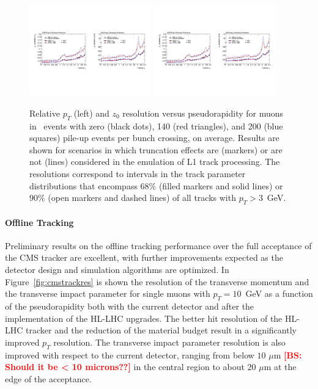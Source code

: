 \begin{figure}[h!tbp]
\begin{center}
  \includegraphics[width=0.47\textwidth]{figures/cmsupgrade/TDR-17-001_fig6_8_a.pdf} \hfill
  \includegraphics[width=0.47\textwidth]{figures/cmsupgrade/TDR-17-001_fig6_8_b.pdf}
  \caption{ Relative $p_T$ (left) and $z_0$ resolution versus pseudorapidity for muons in \ttbar~events with zero (black dots), 140 (red triangles), and 200 (blue squares) pile-up events per bunch crossing, on average. Results are shown for scenarios in which truncation effects are (markers) or are not (lines) considered in the emulation of L1 track processing. The resolutions correspond to intervals in the track parameter distributions that encompass $68\%$ (filled markers and solid lines) or $90\%$ (open markers and dashed lines) of all tracks with $p_T > 3$~GeV.}
  \label{fig:cmsL1tracks}
\end{center}
\end{figure}

\paragraph{Offline Tracking}

Preliminary results on the offline tracking performance over the full acceptance of the CMS tracker are excellent, with further improvements expected as the detector design and simulation algorithms are optimized. In Figure~\ref{fig:cmstrackres} is shown the resolution of the transverse momentum and the transverse impact parameter for single muons with $p_T = 10$~GeV as a function of the pseudorapidity both with the current detector and after the implementation of the HL-LHC upgrades. The better hit resolution of the HL-LHC tracker and the reduction of the material budget result in a significantly improved $p_T$ resolution. The transverse impact parameter resolution is also improved with respect to the current detector, ranging from below $10\,\,\mu\mathrm{m}$ {\bf \textcolor{red}{[BS: Should it be < 10 microns??]}} in the central region to about $20\,\,\mu\mathrm{m}$ at the edge of the acceptance.

